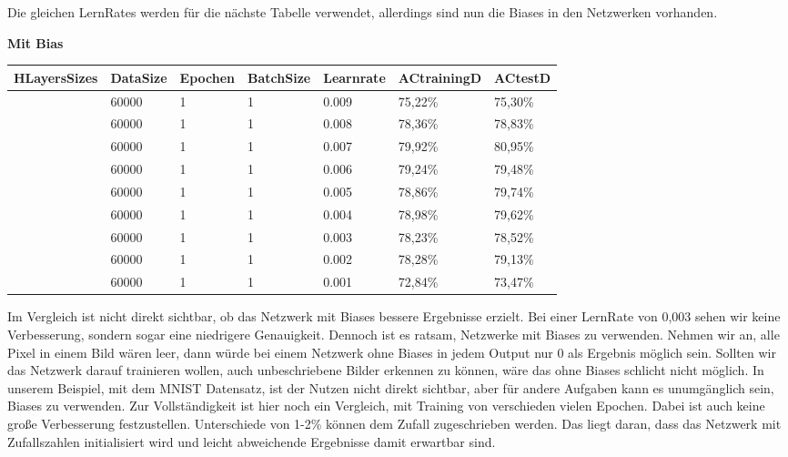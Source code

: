\documentclass[12pt]{article}
\begin{document}
Die gleichen LernRates werden für die nächste Tabelle verwendet, allerdings sind nun die Biases in den Netzwerken vorhanden.

\begin{table}[H]
	\textbf{Mit Bias}
    \centering
    \begin{tabular}{|l|l|l|l|l|l|l|}
    \hline
        HLayersSizes & DataSize & Epochen & BatchSize & Learnrate & ACtrainingD & ACtestD \\ \hline
        [784, 100, 10] & 60000 & 1 & 1 & 0.009 & 75,22\% & 75,30\% \\ \hline
        [784, 100, 10] & 60000 & 1 & 1 & 0.008 & 78,36\% & 78,83\% \\ \hline
        [784, 100, 10] & 60000 & 1 & 1 & 0.007 & 79,92\% & 80,95\% \\ \hline
        [784, 100, 10] & 60000 & 1 & 1 & 0.006 & 79,24\% & 79,48\% \\ \hline
        [784, 100, 10] & 60000 & 1 & 1 & 0.005 & 78,86\% & 79,74\% \\ \hline
        [784, 100, 10] & 60000 & 1 & 1 & 0.004 & 78,98\% & 79,62\% \\ \hline
        [784, 100, 10] & 60000 & 1 & 1 & 0.003 & 78,23\% & 78,52\% \\ \hline
        [784, 100, 10] & 60000 & 1 & 1 & 0.002 & 78,28\% & 79,13\% \\ \hline
        [784, 100, 10] & 60000 & 1 & 1 & 0.001 & 72,84\% & 73,47\% \\ \hline
    \end{tabular}
\end{table}
Im Vergleich ist nicht direkt sichtbar, ob das Netzwerk mit Biases bessere Ergebnisse erzielt. Bei einer LernRate von 0,003 sehen wir keine Verbesserung, sondern sogar eine niedrigere Genauigkeit.
Dennoch ist es ratsam, Netzwerke mit Biases zu verwenden. Nehmen wir an, alle Pixel in einem Bild wären leer, dann würde bei einem Netzwerk ohne Biases in jedem Output nur 0 als Ergebnis möglich sein. Sollten wir das Netzwerk darauf trainieren wollen, auch unbeschriebene Bilder erkennen zu können, wäre das ohne Biases schlicht nicht möglich. In unserem Beispiel, mit dem MNIST Datensatz, ist der Nutzen nicht direkt sichtbar, aber für andere Aufgaben kann es unumgänglich sein, Biases zu verwenden.
Zur Vollständigkeit ist hier noch ein Vergleich, mit Training von verschieden vielen Epochen. Dabei ist auch keine große Verbesserung festzustellen. Unterschiede von 1-2\% können dem Zufall zugeschrieben werden. Das liegt daran, dass das Netzwerk mit Zufallszahlen initialisiert wird und leicht abweichende Ergebnisse damit erwartbar sind. 
\end{document}
